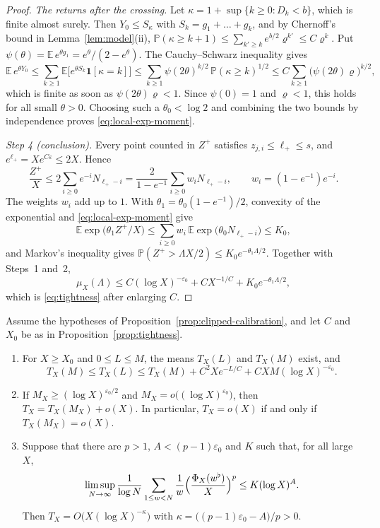 \begin{proof}
\emph{The returns after the crossing.} Let
$\kappa=1+\sup\{k\ge0:D_k<b\}$, which is finite almost surely. Then
$Y_0\le S_\kappa$ with $S_k=g_1+\dots+g_k$, and by Chernoff's bound in
Lemma~\ref{lem:model}(ii),
$\mathbb P(\kappa\ge k+1)\le\sum_{k'\ge k}e^{b/2}\varrho^{k'}
\le C\varrho^{k}$. Put
$\psi(\theta)=\mathbb E\,e^{\theta g_1}=e^\theta/(2-e^\theta)$. The
Cauchy--Schwarz inequality gives
\[
 \mathbb E\,e^{\theta Y_0}
 \le\sum_{k\ge1}\mathbb E\bigl[e^{\theta S_k}\mathbf 1[\kappa=k]\bigr]
 \le\sum_{k\ge1}\psi(2\theta)^{k/2}\,\mathbb P(\kappa\ge k)^{1/2}
 \le C\sum_{k\ge1}\bigl(\psi(2\theta)\varrho\bigr)^{k/2},
\]
which is finite as soon as $\psi(2\theta)\varrho<1$. Since $\psi(0)=1$
and $\varrho<1$, this holds for all small $\theta>0$. Choosing such a
$\theta_0<\log 2$ and combining the two bounds by independence proves
\eqref{eq:local-exp-moment}.

\emph{Step 4 (conclusion).} Every point counted in $Z^+$ satisfies
$z_{j,i}\le\ell_+\le s$, and $e^{\ell_+}=Xe^{C\varepsilon}\le2X$. Hence
\[
 \frac{Z^+}{X}\le2\sum_{i\ge0}e^{-i}N_{\ell_+-i}
 =\frac{2}{1-e^{-1}}\sum_{i\ge0}w_iN_{\ell_+-i},
 \qquad w_i=(1-e^{-1})e^{-i}.
\]
The weights $w_i$ add up to $1$. With
$\theta_1=\theta_0(1-e^{-1})/2$, convexity of the exponential and
\eqref{eq:local-exp-moment} give
\[
 \mathbb E\exp\bigl(\theta_1Z^+/X\bigr)
 \le\sum_{i\ge0}w_i\,\mathbb E\exp\bigl(\theta_0N_{\ell_+-i}\bigr)\le K_0,
\]
and Markov's inequality gives
$\mathbb P(Z^+>\Lambda X/2)\le K_0e^{-\theta_1\Lambda/2}$.
Together with Steps~1 and~2,
\[
 \mu_X(\Lambda)\le C(\log X)^{-\varepsilon_0}+CX^{-1/C}
   +K_0e^{-\theta_1\Lambda/2},
\]
which is \eqref{eq:tightness} after enlarging $C$.
\end{proof}

\begin{corollary}
\label{cor:extreme-tail}
Assume the hypotheses of Proposition~\ref{prop:clipped-calibration}, and
let $C$ and $X_0$ be as in Proposition~\ref{prop:tightness}.
\begin{enumerate}[label=(\alph*)]
 \item For $X\ge X_0$ and $0\le L\le M$, the means $T_X(L)$ and $T_X(M)$
 exist, and
 \[
  T_X(M)\le T_X(L)\le T_X(M)+C^2Xe^{-L/C}+CXM(\log X)^{-\varepsilon_0}.
 \]
 \item If $M_X\ge(\log X)^{\varepsilon_0/2}$ and
 $M_X=o\bigl((\log X)^{\varepsilon_0}\bigr)$, then
 $T_X=T_X(M_X)+o(X)$. In particular, $T_X=o(X)$ if and only if
 $T_X(M_X)=o(X)$.
 \item Suppose that there are $p>1$, $A<(p-1)\varepsilon_0$ and $K$
 such that, for all large $X$,
 \[
  \limsup_{N\to\infty}\frac1{\log N}\sum_{1\le w<N}\frac1w
  \Bigl(\frac{\Phi_X(w^\flat)}X\Bigr)^p\le K(\log X)^A .
 \]
 Then $T_X=O\bigl(X(\log X)^{-\kappa}\bigr)$ with
 $\kappa=\bigl((p-1)\varepsilon_0-A\bigr)/p>0$.
\end{enumerate}
\end{corollary}

